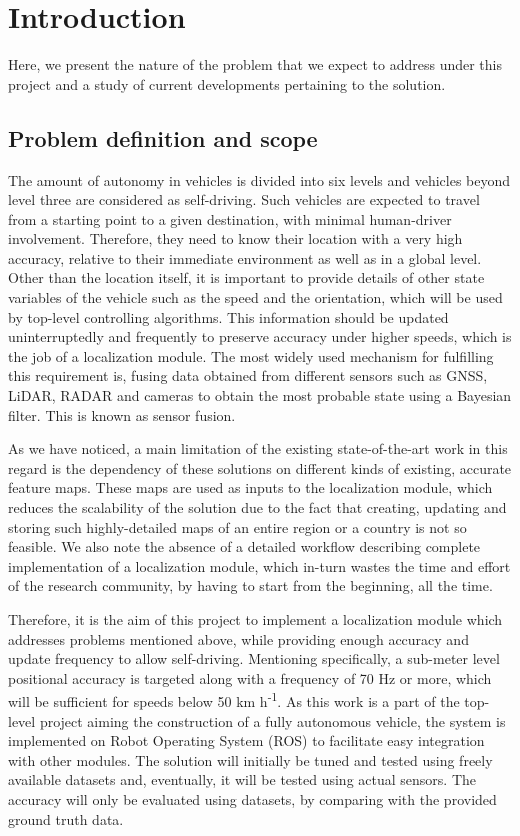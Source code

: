 \chapter{Introduction}
\glsresetall
Here, we present the nature of the problem that we expect to address under this project and a study of current developments pertaining to the solution.




\section{Problem definition and scope}
The amount of autonomy in vehicles is divided into six levels and vehicles beyond level three are considered as self-driving. Such vehicles are expected to travel from a starting point to a given destination, with minimal human-driver involvement. Therefore, they need to know their location with a very high accuracy, relative to their immediate environment as well as in a global level. Other than the location itself, it is important to provide details of other state variables of the vehicle such as the speed and the orientation, which will be used by top-level controlling algorithms. This information should be updated uninterruptedly and frequently to preserve accuracy under higher speeds, which is the job of a localization module. The most widely used mechanism for fulfilling this requirement is, fusing data obtained from different sensors such as \gls{GNSS}, \gls{LiDAR}, \gls{RADAR} and cameras to obtain the most probable state using a Bayesian filter. This is known as sensor fusion.

As we have noticed, a main limitation of the existing state-of-the-art work in this regard is the dependency of these solutions on different kinds of existing, accurate feature maps. These maps are used as inputs to the localization module, which reduces the scalability of the solution due to the fact that creating, updating and storing such highly-detailed maps of an entire region or a country is not so feasible. We also note the absence of a detailed workflow describing complete implementation of a localization module, which in-turn wastes the time and effort of the research community, by having to start from the beginning, all the time.

Therefore, it is the aim of this project to implement a localization module which addresses problems mentioned above, while providing enough accuracy and update frequency to allow self-driving. Mentioning specifically, a sub-meter level positional accuracy is targeted along with a frequency of 70 Hz or more, which will be sufficient for speeds below 50 km h\textsuperscript{-1}\cite{pa:ComputerArchitectures}. As this work is a part of the top-level project aiming the construction of a fully autonomous vehicle, the system is implemented on Robot Operating System (ROS) to facilitate easy integration with other modules. The solution will initially be tuned and tested using freely available datasets and, eventually, it will be tested using actual sensors. The accuracy will only be evaluated using datasets, by comparing with the provided ground truth data.

